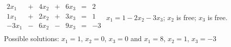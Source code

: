 {$\begin{array}{ccccccc}
2x_1&+&4x_2&+&6x_3&=&2\\
1x_1&+&2x_2&+&3x_3&=&1\\
-3x_1&-&6x_2&-&9x_3&=&-3\\
\end{array}$}
{$x_1=1-2x_2-3x_3$; $x_2$ is free; $x_3$ is free.
Possible solutions: $x_1=1$, $x_2=0$, $x_3=0$ and $x_1=8$, $x_2=1$, $x_3 = -3$}